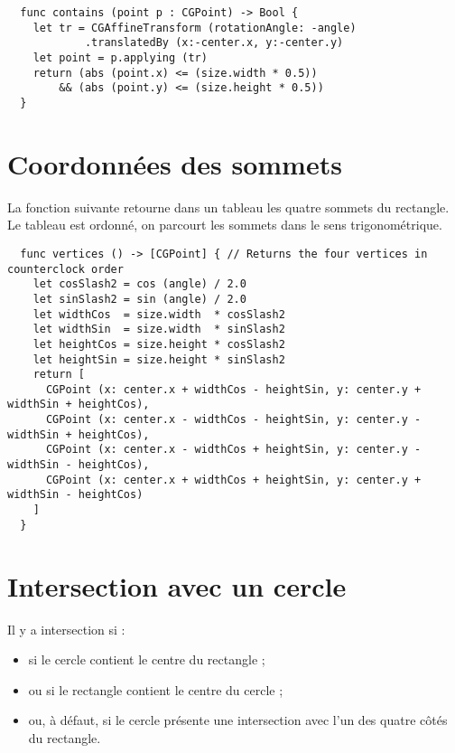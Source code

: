 \begin{lstlisting}
  func contains (point p : CGPoint) -> Bool {
    let tr = CGAffineTransform (rotationAngle: -angle)
            .translatedBy (x:-center.x, y:-center.y)
    let point = p.applying (tr)
    return (abs (point.x) <= (size.width * 0.5))
        && (abs (point.y) <= (size.height * 0.5))
  }
\end{lstlisting}







\section{Coordonnées des sommets}

La fonction suivante retourne dans un tableau les quatre sommets du rectangle. Le tableau est ordonné, on parcourt les sommets dans le sens trigonométrique.

\begin{lstlisting}
  func vertices () -> [CGPoint] { // Returns the four vertices in counterclock order
    let cosSlash2 = cos (angle) / 2.0
    let sinSlash2 = sin (angle) / 2.0
    let widthCos  = size.width  * cosSlash2
    let widthSin  = size.width  * sinSlash2
    let heightCos = size.height * cosSlash2
    let heightSin = size.height * sinSlash2
    return [
      CGPoint (x: center.x + widthCos - heightSin, y: center.y + widthSin + heightCos),
      CGPoint (x: center.x - widthCos - heightSin, y: center.y - widthSin + heightCos),
      CGPoint (x: center.x - widthCos + heightSin, y: center.y - widthSin - heightCos),
      CGPoint (x: center.x + widthCos + heightSin, y: center.y + widthSin - heightCos)
    ]
  }
\end{lstlisting}







\section{Intersection avec un cercle}

Il y a intersection si :
\begin{itemize}
  \item si le cercle contient le centre du rectangle ;
  \item ou si le rectangle contient le centre du cercle ;
  \item ou, à défaut, si le cercle présente une intersection avec l'un des quatre côtés du rectangle.
\end{itemize}



